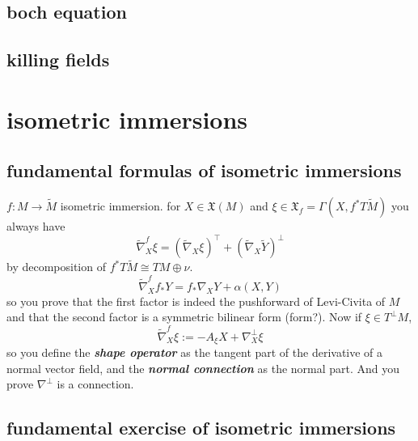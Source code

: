 \subsection{boch equation}

\subsection{killing fields}

\section{isometric immersions}

\subsection{fundamental formulas of isometric immersions}
\(f:M \to \widetilde{M}\) isometric immersion. for \(X \in \mathfrak{X}(M)\) and \(\xi \in \mathfrak{X}_f=\Gamma(X,f^*  T \widetilde{M})\) you always have
\[\widetilde{\nabla}^f_X \xi=\left(\widetilde{\nabla}_X \xi\right)^\top+\left(\widetilde{\nabla}_X \tilde{Y}\right)^\perp\]
by decomposition of \(f^*T \widetilde{M} \cong TM \oplus \nu\).
\[\boxed{\widetilde{\nabla}_X^ff_*Y=f_* \nabla_XY+\alpha(X,Y)}\]
so you prove that the first factor is indeed the pushforward of Levi-Civita of \(M\) and that the second factor is a symmetric bilinear form (form?). Now if \(\xi \in T^\perp M\),
\[\boxed{\widetilde{\nabla}^f_X\xi:=-A_\xi X+\nabla^\perp_X\xi}\]
so you define the \textit{\textbf{shape operator}} as the tangent part of the derivative of a normal vector field, and the \textit{\textbf{normal connection}} as the normal part. And you prove \(\nabla^\perp\) is a connection.

\subsection{fundamental exercise of isometric immersions}

